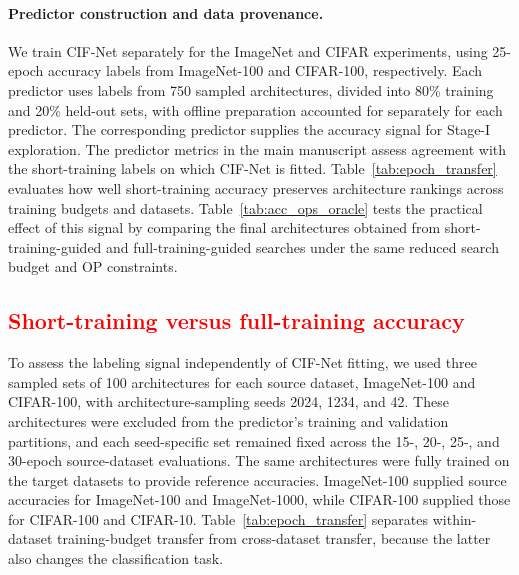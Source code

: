 \documentclass[preprint,review,12p,times]{elsarticle}
\begin{document}
\label{sec:supp_predictor_groups}

\paragraph{Predictor construction and data provenance.}

We train CIF-Net separately for the ImageNet and CIFAR experiments, using 25-epoch accuracy labels from ImageNet-100 and CIFAR-100, respectively. Each predictor uses labels from 750 sampled architectures, divided into 80\% training and 20\% held-out sets, with offline preparation accounted for separately for each predictor. The corresponding predictor supplies the accuracy signal for Stage-I exploration. The predictor metrics in the main manuscript assess agreement with the short-training labels on which CIF-Net is fitted. Table~\ref{tab:epoch_transfer} evaluates how well short-training accuracy preserves architecture rankings across training budgets and datasets. Table~\ref{tab:acc_ops_oracle} tests the practical effect of this signal by comparing the final architectures obtained from short-training-guided and full-training-guided searches under the same reduced search budget and OP constraints.

\subsection{\textcolor{red}{Short-training versus full-training accuracy}}

\label{sec:supp_epoch_transfer}

To assess the labeling signal independently of CIF-Net fitting, we used three sampled sets of 100 architectures for each source dataset, ImageNet-100 and CIFAR-100, with architecture-sampling seeds 2024, 1234, and 42. These architectures were excluded from the predictor's training and validation partitions, and each seed-specific set remained fixed across the 15-, 20-, 25-, and 30-epoch source-dataset evaluations. The same architectures were fully trained on the target datasets to provide reference accuracies. ImageNet-100 supplied source accuracies for ImageNet-100 and ImageNet-1000, while CIFAR-100 supplied those for CIFAR-100 and CIFAR-10. Table~\ref{tab:epoch_transfer} separates within-dataset training-budget transfer from cross-dataset transfer, because the latter also changes the classification task.
\end{document}
